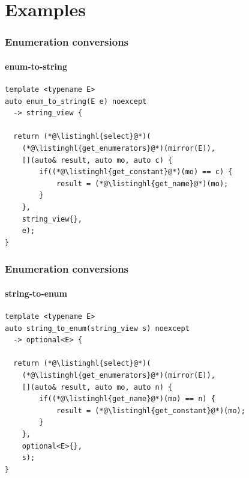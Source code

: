 \documentclass[compress,table,xcolor=table]{beamer}
\begin{document}
\section{Examples}
\begin{frame}[fragile]
  \frametitle{Enumeration conversions}
  \framesubtitle{enum-to-string}
  \begin{lstlisting}[language=c++2x]
template <typename E>
auto enum_to_string(E e) noexcept
  -> string_view {

  return (*@\listinghl{select}@*)(
    (*@\listinghl{get_enumerators}@*)(mirror(E)),
    [](auto& result, auto mo, auto c) {
        if((*@\listinghl{get_constant}@*)(mo) == c) {
            result = (*@\listinghl{get_name}@*)(mo);
        }
    },
    string_view{},
    e);
}
  \end{lstlisting}
\end{frame}
\begin{frame}[fragile]
  \frametitle{Enumeration conversions}
  \framesubtitle{string-to-enum}
  \begin{lstlisting}[language=c++2x]
template <typename E>
auto string_to_enum(string_view s) noexcept
  -> optional<E> {

  return (*@\listinghl{select}@*)(
    (*@\listinghl{get_enumerators}@*)(mirror(E)),
    [](auto& result, auto mo, auto n) {
        if((*@\listinghl{get_name}@*)(mo) == n) {
            result = (*@\listinghl{get_constant}@*)(mo);
        }
    },
    optional<E>{},
    s);
}
  \end{lstlisting}
\end{frame}
\end{document}
